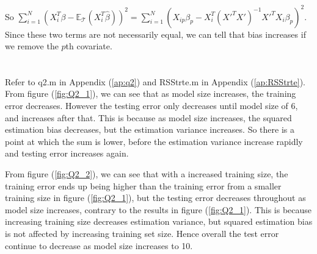 \documentclass{article}
\newcommand{\hb}{\hat{\beta}}
\begin{document}
	So $ \sum_{i = 1}^{N} (X_i^T \beta - \mathbb{E}_{\mathcal{T}}(X_i^T \hb ))^2 = \sum_{i = 1}^{N}(X_{ip}\beta_p - X_i^T(X'^TX')^{-1} X'^TX_i \beta_p)^2 $.\\
	Since these two terms are not necessarily equal, we can tell that bias increases if we remove the $ p $th covariate.
	
	

	
	
	
	\section{}
	Refer to q2.m in Appendix (\ref{ap:q2}) and RSStrte.m in Appendix (\ref{ap:RSStrte}).
	From figure (\ref{fig:Q2_1}), we can see that as model size increases, the training error decreases. However the testing error only decreases until model size of 6, and increases after that. This is because as model size increases, the squared estimation bias decreases, but the estimation variance increases. So there is a point at which the sum is lower, before the estimation variance increase rapidly and testing error increases again. 
	
	From figure (\ref{fig:Q2_2}), we can see that with a increased training size, the training error ends up being higher than the training error from a smaller training size in figure (\ref{fig:Q2_1}), but the testing error decreases throughout as model size increases, contrary to the results in figure (\ref{fig:Q2_1}). This is because increasing training size decreases estimation variance, but squared estimation bias is not affected by increasing training set size. Hence overall the test error continue to decrease as model size increases to 10.
	
	
	
\end{document}
